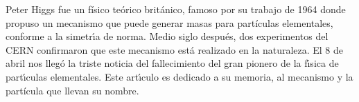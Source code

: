 Peter Higgs fue un f\'isico te\'orico brit\'anico, famoso por su
trabajo de 1964 donde propuso un mecanismo que puede generar masas
para part\'iculas elementales, conforme a la simetr\'{\i}a de norma.
Medio siglo despu\'es, dos experimentos del CERN confirmaron
que este mecanismo est\'a realizado en la naturaleza.
El 8 de abril nos lleg\'{o} la triste noticia del fallecimiento del
gran pionero de la f\'{\i}sica de part\'{\i}culas elementales.
Este art\'{\i}culo es dedicado a su memoria, al mecanismo
y la part\'icula que llevan su nombre.